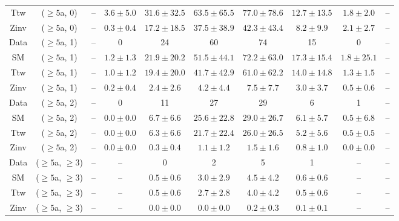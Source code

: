 \begin{table}[h!]
{\begin{tabular}{cccccccccc}
	Ttw & ($\ge5$a, 0) & -- & $3.6\pm 5.0$ & $31.6\pm 32.5$ & $63.5\pm 65.5$ & $77.0\pm 78.6$ & $12.7\pm 13.5$ & $1.8\pm 2.0$ & -- \\[0.5ex] 
	Zinv & ($\ge5$a, 0) & -- & $0.3\pm 0.4$ & $17.2\pm 18.5$ & $37.5\pm 38.9$ & $42.3\pm 43.4$ & $8.2\pm 9.9$ & $2.1\pm 2.7$ & -- \\[0.5ex] 
	Data & ($\ge5$a, 1) & -- & 0 & 24 & 60 & 74 & 15 & 0 & -- \\[0.5ex] 
	SM & ($\ge5$a, 1) & -- & $1.2\pm 1.3$ & $21.9\pm 20.2$ & $51.5\pm 44.1$ & $72.2\pm 63.0$ & $17.3\pm 15.4$ & $1.8\pm 25.1$ & -- \\[0.5ex] 
	Ttw & ($\ge5$a, 1) & -- & $1.0\pm 1.2$ & $19.4\pm 20.0$ & $41.7\pm 42.9$ & $61.0\pm 62.2$ & $14.0\pm 14.8$ & $1.3\pm 1.5$ & -- \\[0.5ex] 
	Zinv & ($\ge5$a, 1) & -- & $0.2\pm 0.4$ & $2.4\pm 2.6$ & $4.2\pm 4.4$ & $7.5\pm 7.7$ & $3.0\pm 3.7$ & $0.5\pm 0.6$ & -- \\[0.5ex] 
	Data & ($\ge5$a, 2) & -- & 0 & 11 & 27 & 29 & 6 & 1 & -- \\[0.5ex] 
	SM & ($\ge5$a, 2) & -- & $0.0\pm 0.0$ & $6.7\pm 6.6$ & $25.6\pm 22.8$ & $29.0\pm 26.7$ & $6.1\pm 5.7$ & $0.5\pm 6.8$ & -- \\[0.5ex] 
	Ttw & ($\ge5$a, 2) & -- & $0.0\pm 0.0$ & $6.3\pm 6.6$ & $21.7\pm 22.4$ & $26.0\pm 26.5$ & $5.2\pm 5.6$ & $0.5\pm 0.5$ & -- \\[0.5ex] 
	Zinv & ($\ge5$a, 2) & -- & $0.0\pm 0.0$ & $0.3\pm 0.4$ & $1.1\pm 1.2$ & $1.5\pm 1.6$ & $0.8\pm 1.0$ & $0.0\pm 0.0$ & -- \\[0.5ex] 
	Data & ($\ge5$a, $\ge3$) & -- & -- & 0 & 2 & 5 & 1 & -- & -- \\[0.5ex] 
	SM & ($\ge5$a, $\ge3$) & -- & -- & $0.5\pm 0.6$ & $3.0\pm 2.9$ & $4.5\pm 4.2$ & $0.6\pm 0.6$ & -- & -- \\[0.5ex] 
	Ttw & ($\ge5$a, $\ge3$) & -- & -- & $0.5\pm 0.6$ & $2.7\pm 2.8$ & $4.0\pm 4.2$ & $0.5\pm 0.6$ & -- & -- \\[0.5ex] 
	Zinv & ($\ge5$a, $\ge3$) & -- & -- & $0.0\pm 0.0$ & $0.0\pm 0.0$ & $0.2\pm 0.3$ & $0.1\pm 0.1$ & -- & -- \\[0.5ex] 
	\hline
	\hline
\end{tabular}}
\end{table}
